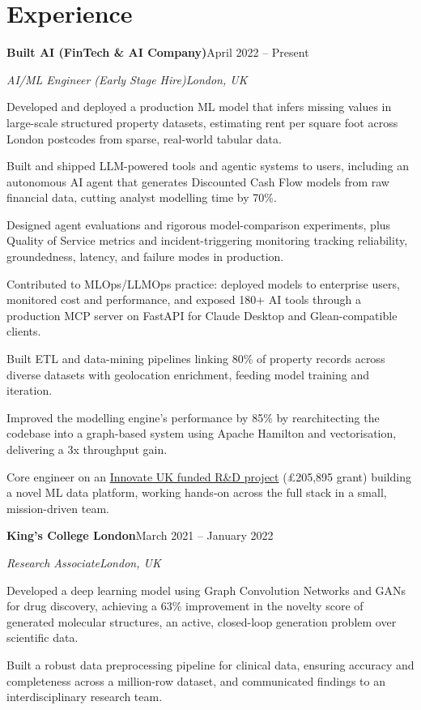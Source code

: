 \documentclass[10pt,a4paper]{article}
\newcommand{\entry}[4]{%
  {\color{company}\bfseries #1}\hfill {\color{muted}#2}\par
  \vspace{1pt}
  {\itshape #3}\hfill {\color{muted}\itshape #4}\par
  \vspace{3pt}%
}
\begin{document}
\section{Experience}
\entry{Built AI (FinTech \& AI Company)}{April 2022 -- Present}{AI/ML Engineer (Early Stage Hire)}{London, UK}
\begin{tight}
  \item Developed and deployed a production ML model that infers missing values in large-scale structured property datasets, estimating rent per square foot across London postcodes from sparse, real-world tabular data.
  \item Built and shipped LLM-powered tools and agentic systems to users, including an autonomous AI agent that generates Discounted Cash Flow models from raw financial data, cutting analyst modelling time by 70\%.
  \item Designed agent evaluations and rigorous model-comparison experiments, plus Quality of Service metrics and incident-triggering monitoring tracking reliability, groundedness, latency, and failure modes in production.
  \item Contributed to MLOps/LLMOps practice: deployed models to enterprise users, monitored cost and performance, and exposed 180+ AI tools through a production MCP server on FastAPI for Claude Desktop and Glean-compatible clients.
  \item Built ETL and data-mining pipelines linking 80\% of property records across diverse datasets with geolocation enrichment, feeding model training and iteration.
  \item Improved the modelling engine's performance by 85\% by rearchitecting the codebase into a graph-based system using Apache Hamilton and vectorisation, delivering a 3x throughput gain.
  \item Core engineer on an \href{https://gtr.ukri.org/projects?ref=10022996}{Innovate UK funded R\&D project} (\pounds205,895 grant) building a novel ML data platform, working hands-on across the full stack in a small, mission-driven team.
\end{tight}

\entry{King's College London}{March 2021 -- January 2022}{Research Associate}{London, UK}
\begin{tight}
  \item Developed a deep learning model using Graph Convolution Networks and GANs for drug discovery, achieving a 63\% improvement in the novelty score of generated molecular structures, an active, closed-loop generation problem over scientific data.
  \item Built a robust data preprocessing pipeline for clinical data, ensuring accuracy and completeness across a million-row dataset, and communicated findings to an interdisciplinary research team.
\end{tight}
\end{document}
